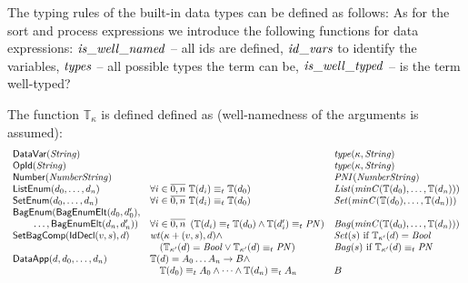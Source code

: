 \documentclass[fleqn,a4paper]{article}
\newcommand{\aterm}[1]{\mathsf{#1}}
\newcommand{\type}{\mathbb{T}}
\newcommand{\PNI}{\nm{PNI}}
\newcommand{\PN}{\nm{PN}}
\newcommand{\List}{\nm{List}}
\newcommand{\Set}{\nm{Set}}
\newcommand{\Bag}{\nm{Bag}}
\newcommand{\typecompat}{\equiv_t}
\newcommand{\wt}{\nm{wt}}
\begin{document}
The typing rules of the built-in data types can be defined as follows:
As for the sort and process expressions we introduce the following functions for data
expressions: $\mathit{is\_well\_named}$ -- all ids are defined, $\mathit{id\_vars}$ to identify
the variables, $\mathit{types}$ -- all possible types the term can be,
$\mathit{is\_well\_typed}$ -- is the term well-typed?

The function $\type_\kappa$ is defined defined as (well-namedness of the arguments is assumed):
\begin{displaymath}
\begin{array}{lll}
\aterm{DataVar}(\nm{String})         &                                                            & \nm{type}(\kappa,\nm{String})\\
\aterm{OpId}(\nm{String})            &                                                            & \nm{type}(\kappa,\nm{String})\\
\aterm{Number}(\nm{NumberString})    &                                                            & \PNI(\nm{NumberString})\\
\aterm{ListEnum}(d_0,\dots, d_n)     & \forall i\in\overline{0,n}~\type(d_i)\typecompat\type(d_0) & \List(\nm{minC}(\type(d_0),\dots,\type(d_n)))\\
\aterm{SetEnum}(d_0,\dots, d_n)      & \forall i\in\overline{0,n}~\type(d_i)\typecompat\type(d_0) & \Set(\nm{minC}(\type(d_0),\dots,\type(d_n)))\\
\aterm{BagEnum}(\aterm{BagEnumElt}(d_0,d_0'),\\
\t2\dots,\aterm{BagEnumElt}(d_n,d_n'))
                                     & \forall i\in\overline{0,n}~\left(\type(d_i)\typecompat\type(d_0)\land\type(d_i')\typecompat\PN\right)
                                                                                                  & \Bag(\nm{minC}(\type(d_0),\dots,\type(d_n)))\\
\aterm{SetBagComp}(\aterm{IdDecl}(v,s),d)
                                     & \wt(\kappa+(v,s),d)\land                                   & \Set(s)~\text{if}~\type_{\kappa'}(d)=\Bool \\
                                     &\t1(\type_{\kappa'}(d)=\Bool\lor\type_{\kappa'}(d)\typecompat\PN)               & \Bag(s)~\text{if}~\type_{\kappa'}(d)\typecompat\PN\\
\aterm{DataApp}(d, d_0,\dots,d_n)    & \type(d)=A_0 \dots A_n\to B\land\\
                                     & \t1\type(d_0)\typecompat A_0\land\dots\land\type(d_n)\typecompat A_n & B\\

\end{array}
\end{displaymath}
\end{document}
